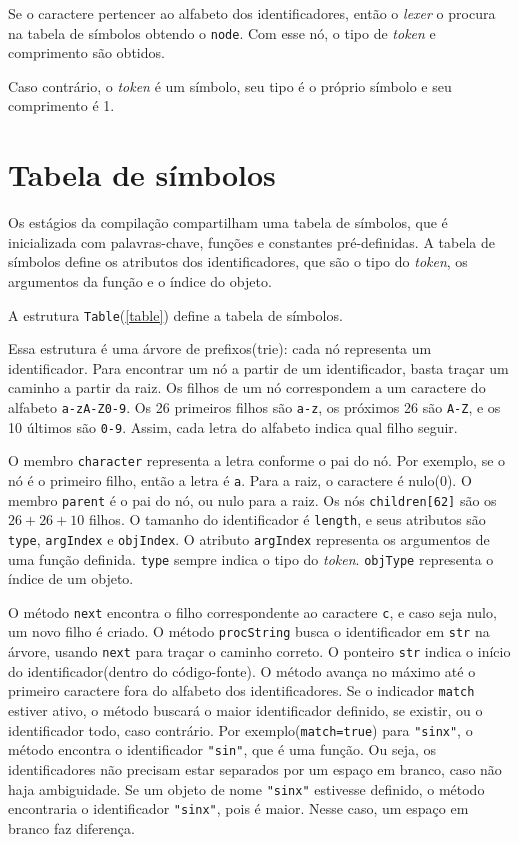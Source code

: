 Se o caractere pertencer ao alfabeto dos identificadores,
então o \textit{lexer} o procura na tabela de símbolos obtendo o \texttt{node}.
Com esse nó, o tipo de \textit{token} e comprimento são obtidos.

Caso contrário, o \textit{token} é um símbolo, seu tipo é o próprio símbolo
e seu comprimento é 1.

\newpage

\section{Tabela de símbolos}
Os estágios da compilação compartilham uma tabela de símbolos,
que é inicializada com palavras-chave,
funções e constantes pré-definidas.
A tabela de símbolos define os atributos dos identificadores,
que são o tipo do \textit{token}, os argumentos da função e o índice do objeto.

A estrutura \texttt{Table}(\ref{table}) define a tabela de símbolos.
\lstset{language=c++}

Essa estrutura é uma árvore de prefixos(trie):
cada nó representa um identificador. Para encontrar um nó a partir
de um identificador, basta traçar um caminho a partir da raiz.
Os filhos de um nó correspondem a um caractere do alfabeto \texttt{a-zA-Z0-9}.
Os 26 primeiros filhos são \texttt{a-z}, os próximos 26 são \texttt{A-Z},
e os 10 últimos são \texttt{0-9}.
Assim, cada letra do alfabeto indica qual filho seguir.

O membro \texttt{character} representa a letra conforme o pai do nó.
Por exemplo, se o nó é o primeiro filho, então a letra é \texttt{a}.
Para a raiz, o caractere é nulo(0).
O membro \texttt{parent} é o pai do nó, ou nulo para a raiz.
Os nós \texttt{children[62]} são os $26+26+10$ filhos.
O tamanho do identificador é \texttt{length}, e seus atributos são
\texttt{type}, \texttt{argIndex} e \texttt{objIndex}.
O atributo \texttt{argIndex} representa os argumentos de uma função definida.
\texttt{type} sempre indica o tipo do \textit{token}.
\texttt{objType} representa o índice de um objeto.

O método \texttt{next} encontra o filho correspondente ao caractere \texttt{c},
e caso seja nulo, um novo filho é criado.
O método \texttt{procString} busca o identificador em \texttt{str} na árvore,
usando \texttt{next} para traçar o caminho correto.
O ponteiro \texttt{str} indica o início do identificador(dentro do código-fonte).
O método avança no máximo até o primeiro caractere fora do alfabeto
dos identificadores.
Se o indicador \texttt{match} estiver ativo, o método buscará o
maior identificador definido, se existir, ou o identificador todo, caso contrário.
Por exemplo(\texttt{match=true}) para \texttt{"sinx"},
o método encontra o identificador \texttt{"sin"}, que é uma função.
Ou seja, os identificadores não precisam estar separados por um espaço em branco,
caso não haja ambiguidade.
Se um objeto de nome \texttt{"sinx"} estivesse definido,
o método encontraria o identificador \texttt{"sinx"}, pois é maior.
Nesse caso, um espaço em branco faz diferença.

